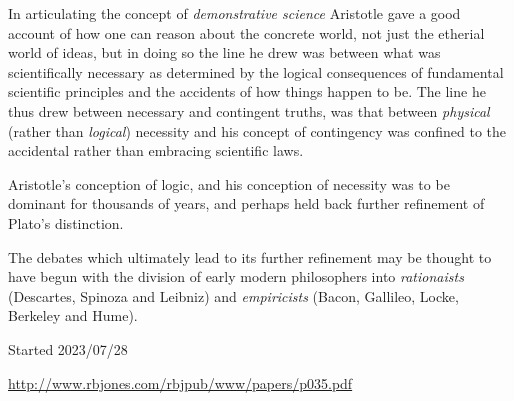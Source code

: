 \documentclass[10pt,titlepage]{book}
\begin{document}
In articulating the concept of \emph{demonstrative science} Aristotle gave a good account of how one can reason about the concrete world, not just the etherial world of ideas, but in doing so the line he drew was between what was scientifically necessary as determined by the logical consequences of fundamental scientific principles and the accidents of how things happen to be.
The line he thus drew between necessary and contingent truths, was that between \emph{physical} (rather than \emph{logical}) necessity and his concept of contingency was confined to the accidental rather than embracing scientific laws.

Aristotle's conception of logic, and his conception of necessity was to be dominant for thousands of years, and perhaps held back further refinement of Plato's distinction.

The debates which ultimately lead to its further refinement may be thought to have begun with the division of early modern philosophers into \emph{rationaists} (Descartes, Spinoza and Leibniz) and \emph{empiricists} (Bacon, Gallileo, Locke, Berkeley and Hume).

\pagebreak
{}
{}





\tiny{
Started 2023/07/28


\href{http://www.rbjones.com/rbjpub/www/papers/p034.pdf}{http://www.rbjones.com/rbjpub/www/papers/p035.pdf}

}%
\end{document}
